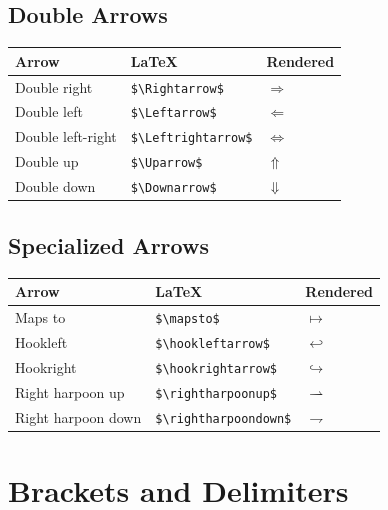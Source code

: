 \documentclass[
  letterpaper,
  DIV=11,
  numbers=noendperiod]{scrartcl}
\begin{document}
\hypertarget{double-arrows}{%
\subsection{Double Arrows}\label{double-arrows}}

\begin{longtable}[]{@{}lll@{}}
\toprule()
Arrow & LaTeX & Rendered \\
\midrule()
\endhead
Double right & \texttt{\$\textbackslash{}Rightarrow\$} &
\(\Rightarrow\) \\
Double left & \texttt{\$\textbackslash{}Leftarrow\$} & \(\Leftarrow\) \\
Double left-right & \texttt{\$\textbackslash{}Leftrightarrow\$} &
\(\Leftrightarrow\) \\
Double up & \texttt{\$\textbackslash{}Uparrow\$} & \(\Uparrow\) \\
Double down & \texttt{\$\textbackslash{}Downarrow\$} & \(\Downarrow\) \\
\bottomrule()
\end{longtable}

\hypertarget{specialized-arrows}{%
\subsection{Specialized Arrows}\label{specialized-arrows}}

\begin{longtable}[]{@{}lll@{}}
\toprule()
Arrow & LaTeX & Rendered \\
\midrule()
\endhead
Maps to & \texttt{\$\textbackslash{}mapsto\$} & \(\mapsto\) \\
Hookleft & \texttt{\$\textbackslash{}hookleftarrow\$} &
\(\hookleftarrow\) \\
Hookright & \texttt{\$\textbackslash{}hookrightarrow\$} &
\(\hookrightarrow\) \\
Right harpoon up & \texttt{\$\textbackslash{}rightharpoonup\$} &
\(\rightharpoonup\) \\
Right harpoon down & \texttt{\$\textbackslash{}rightharpoondown\$} &
\(\rightharpoondown\) \\
\bottomrule()
\end{longtable}

\hypertarget{brackets-and-delimiters}{%
\section{Brackets and Delimiters}\label{brackets-and-delimiters}}
\end{document}
